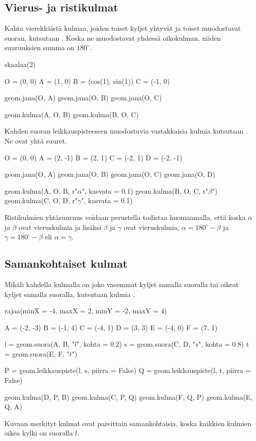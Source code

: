 \subsection*{Vierus- ja ristikulmat}
Kahta vierekkäistä kulmaa, joiden toiset kyljet yhtyvät ja toiset muodostavat suoran, kutsutaan . Koska ne muodostavat yhdessä oikokulman, niiden suuruuksien summa on $180^\circ$. 
\begin{center}
\begin{kuva}
	skaalaa(2)
	
	O = (0, 0)
	A = (1, 0)
	B = (cos(1), sin(1))
	C = (-1, 0)
	
	geom.jana(O, A)
	geom.jana(O, B)
	geom.jana(O, C)
	
	geom.kulma(A, O, B)
	geom.kulma(B, O, C)
\end{kuva}
\end{center}

Kahden suoran leikkauspisteeseen muodostuvia vastakkaisia kulmia kutsutaan . Ne ovat yhtä suuret.
\begin{center}
\begin{kuva}
	O = (0, 0)
	A = (2, -1)
	B = (2, 1)
	C = (-2, 1)
	D = (-2, -1)
	
	geom.jana(O, A)
	geom.jana(O, B)
	geom.jana(O, C)
	geom.jana(O, D)
	
	geom.kulma(A, O, B, r"$\alpha$", kasvata = 0.1)
	geom.kulma(B, O, C, r"$\beta$")
	geom.kulma(C, O, D, r"$\gamma$", kasvata = 0.1)
\end{kuva}
\end{center}
Ristikulmien yhtäsuuruus voidaan perustella todistaa huomaamalla, että koska $\alpha$ ja $\beta$ ovat vieruskulmia ja lisäksi $\beta$ ja $\gamma$ ovat vieruskulmia, $\alpha = 180^\circ - \beta$ ja $\gamma = 180^\circ - \beta$ eli $\alpha = \gamma$.

\subsection*{Samankohtaiset kulmat}
Mikäli kahdella kulmalla on joko vasemmat kyljet samalla suoralla tai oikeat kyljet samalla suoralla, kutsutaan kulmia .

\begin{esimerkki}
\begin{kuva}
	rajaa(minX = -4, maxX = 2, minY = -2, maxY = 4)
	
	A = (-2, -3)
	B = (-1, 4)
	C = (-4, 1)
	D = (3, 3)
	E = (-4, 0)
	F = (7, 1)
	
	l = geom.suora(A, B, "$l$", kohta = 0.2)
	s = geom.suora(C, D, "$s$", kohta = 0.8)
	t = geom.suora(E, F, "$t$")
	
	P = geom.leikkauspiste(l, s, piirra = False)
	Q = geom.leikkauspiste(l, t, piirra = False)
	
	geom.kulma(D, P, B)
	geom.kulma(C, P, Q)
	geom.kulma(F, Q, P)
	geom.kulma(E, Q, A)
\end{kuva}

Kuvaan merkityt kulmat ovat pareittain samankohtaisia, koska kaikkien kulmien oikea kylki on suoralla $l$.
\end{esimerkki}

